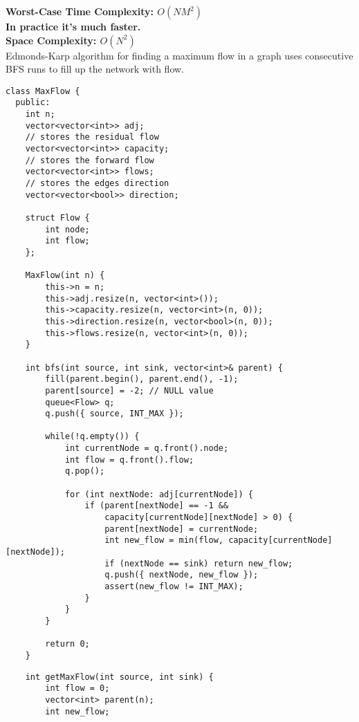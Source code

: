 \textbf{Worst-Case Time Complexity: $O(NM^2)$}\\
\textbf{In practice it's much faster.}\\
\textbf{Space Complexity: $O(N^2)$}\\

Edmonds-Karp algorithm for finding a maximum flow in a graph uses
consecutive BFS runs to fill up the network with flow.


\begin{center}
\begin{minipage}[t]{0.45\linewidth}
\begin{lstlisting}
class MaxFlow {
  public:
    int n;
    vector<vector<int>> adj;
    // stores the residual flow
    vector<vector<int>> capacity;
    // stores the forward flow
    vector<vector<int>> flows;
    // stores the edges direction
    vector<vector<bool>> direction;

    struct Flow {
        int node;
        int flow;
    };

    MaxFlow(int n) {
        this->n = n;
        this->adj.resize(n, vector<int>());
        this->capacity.resize(n, vector<int>(n, 0));
        this->direction.resize(n, vector<bool>(n, 0));
        this->flows.resize(n, vector<int>(n, 0));
    }

    int bfs(int source, int sink, vector<int>& parent) {
        fill(parent.begin(), parent.end(), -1);
        parent[source] = -2; // NULL value
        queue<Flow> q;
        q.push({ source, INT_MAX });

        while(!q.empty()) {
            int currentNode = q.front().node;
            int flow = q.front().flow;
            q.pop();

            for (int nextNode: adj[currentNode]) {
                if (parent[nextNode] == -1 &&
                    capacity[currentNode][nextNode] > 0) {
                    parent[nextNode] = currentNode;
                    int new_flow = min(flow, capacity[currentNode][nextNode]);
                    if (nextNode == sink) return new_flow;
                    q.push({ nextNode, new_flow });
                    assert(new_flow != INT_MAX);
                }
            }
        }

        return 0;
    }
\end{lstlisting}
\end{minipage}
\qquad
\begin{minipage}[t]{0.45\linewidth}
\begin{lstlisting}
    int getMaxFlow(int source, int sink) {
        int flow = 0;
        vector<int> parent(n);
        int new_flow;


\end{lstlisting}
\end{minipage}
\end{center}
